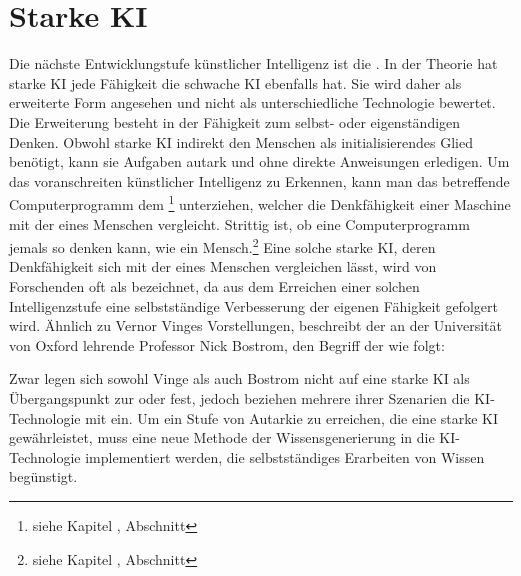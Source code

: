 \documentclass[12pt,german,ngerman]{report}
\begin{document}
    \section{Starke KI}
        Die nächste Entwicklungstufe künstlicher Intelligenz ist
        die .
        In der Theorie hat starke KI jede Fähigkeit die schwache KI ebenfalls hat.
        Sie wird daher als erweiterte Form angesehen und nicht als unterschiedliche
        Technologie bewertet.
        Die Erweiterung besteht in der Fähigkeit zum selbst- oder eigenständigen Denken. Obwohl
        starke KI indirekt den Menschen als initialisierendes Glied benötigt,
        kann sie Aufgaben autark und ohne direkte Anweisungen erledigen.
        Um das voranschreiten künstlicher Intelligenz zu Erkennen, kann
        man das betreffende Computerprogramm dem 
        \footnote{siehe Kapitel , Abschnitt } unterziehen,
        welcher die Denkfähigkeit einer Maschine mit der eines Menschen vergleicht.
        Strittig ist, ob eine Computerprogramm jemals so denken kann, wie ein 
        Mensch.\footnote{siehe Kapitel , Abschnitt }
        Eine solche starke KI, deren Denkfähigkeit sich mit der eines Menschen vergleichen lässt, wird
        von Forschenden oft als  bezeichnet, da aus dem Erreichen einer solchen Intelligenzstufe
        eine selbstständige Verbesserung der eigenen Fähigkeit gefolgert wird.
        Ähnlich zu Vernor Vinges Vorstellungen, beschreibt der an der Universität von Oxford lehrende Professor
        Nick Bostrom, den Begriff der  wie folgt:
        \begin{displayquote}
            \cite{bostrom1998long}
        \end{displayquote}
        Zwar legen sich sowohl Vinge als auch Bostrom nicht auf eine starke KI als Übergangspunkt
        zur \cite{vinge1993technological} oder \cite{bostrom1998long} fest,
        jedoch beziehen mehrere ihrer Szenarien die KI-Technologie mit ein.
        Um ein Stufe von Autarkie zu erreichen, die eine starke KI gewährleistet, muss eine neue Methode
        der Wissensgenerierung in die KI-Technologie implementiert werden, die selbstständiges Erarbeiten von Wissen begünstigt.
        
\end{document}
